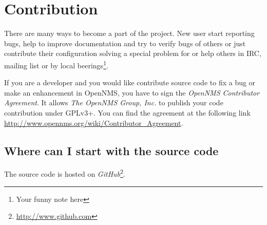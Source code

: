 \section{Contribution}
There are many ways to become a part of the project. New user start reporting bugs, help to improve documentation and try to verify bugs of others or just contribute their configuration solving a special problem for or help others in IRC, mailing list or by local beerings\footnote{Your funny note here}.

If you are a developer and you would like contribute source code to fix a bug or make an enhancement in OpenNMS, you have to sign the \emph{OpenNMS Contributor Agreement}. It allows \textit{The OpenNMS Group, Inc.} to publish your code contribution under GPLv3+. You can find the agreement at the following link \url{http://www.opennms.org/wiki/Contributor_Agreement}. 

\subsection*{Where can I start with the source code}
The source code is hosted on \emph{GitHub}\footnote{\url{http://www.github.com}}. 



